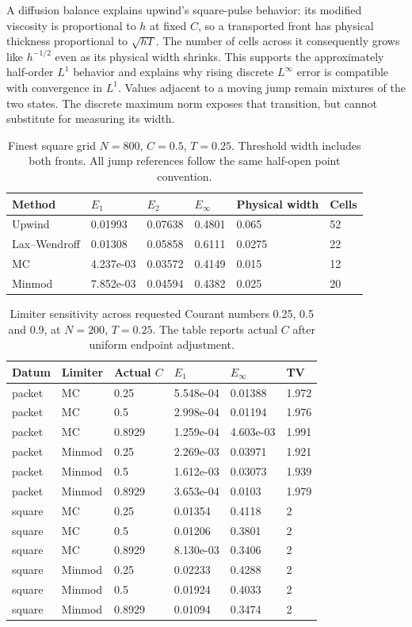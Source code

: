 A diffusion balance explains upwind's square-pulse behavior: its modified viscosity is proportional to $h$ at fixed $C$, so a transported front has physical thickness proportional to $\sqrt{hT}$. The number of cells across it consequently grows like $h^{-1/2}$ even as its physical width shrinks. This supports the approximately half-order $L^1$ behavior and explains why rising discrete $L^\infty$ error is compatible with convergence in $L^1$. Values adjacent to a moving jump remain mixtures of the two states. The discrete maximum norm exposes that transition, but cannot substitute for measuring its width.
\begin{table}[htbp]\centering\small
\caption{Finest square grid $N=800$, $C=0.5$, $T=0.25$. Threshold width includes both fronts. All jump references follow the same half-open point convention.}\label{tab:squarefine}
\begin{tabular}{llllll}
\toprule
Method & $E_1$ & $E_2$ & $E_\infty$ & Physical width & Cells\\\midrule
Upwind & 0.01993 & 0.07638 & 0.4801 & 0.065 & 52\\
Lax--Wendroff & 0.01308 & 0.05858 & 0.6111 & 0.0275 & 22\\
MC & 4.237e-03 & 0.03572 & 0.4149 & 0.015 & 12\\
Minmod & 7.852e-03 & 0.04594 & 0.4382 & 0.025 & 20\\
\bottomrule\end{tabular}\end{table}
\begin{table}[htbp]\centering\small
\caption{Limiter sensitivity across requested Courant numbers 0.25, 0.5 and 0.9, at $N=200$, $T=0.25$. The table reports actual $C$ after uniform endpoint adjustment.}\label{tab:limiterC}
\begin{tabular}{llllll}
\toprule
Datum & Limiter & Actual $C$ & $E_1$ & $E_\infty$ & TV\\\midrule
packet & MC & 0.25 & 5.548e-04 & 0.01388 & 1.972\\
packet & MC & 0.5 & 2.998e-04 & 0.01194 & 1.976\\
packet & MC & 0.8929 & 1.259e-04 & 4.603e-03 & 1.991\\
packet & Minmod & 0.25 & 2.269e-03 & 0.03971 & 1.921\\
packet & Minmod & 0.5 & 1.612e-03 & 0.03073 & 1.939\\
packet & Minmod & 0.8929 & 3.653e-04 & 0.0103 & 1.979\\
square & MC & 0.25 & 0.01354 & 0.4118 & 2\\
square & MC & 0.5 & 0.01206 & 0.3801 & 2\\
square & MC & 0.8929 & 8.130e-03 & 0.3406 & 2\\
square & Minmod & 0.25 & 0.02233 & 0.4288 & 2\\
square & Minmod & 0.5 & 0.01924 & 0.4033 & 2\\
square & Minmod & 0.8929 & 0.01094 & 0.3474 & 2\\
\bottomrule\end{tabular}\end{table}
